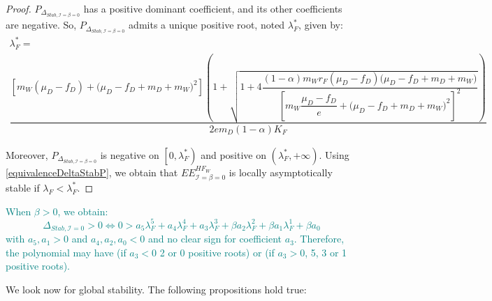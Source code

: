 \documentclass{article}
\newcommand{\lfw}{\lambda_{F}}
\newcommand{\lfw}{\lambda_{F}}
\newcommand{\cI}{\mathcal{I}}
\newcommand{\marc}[1]{\textcolor{teal}{#1}}
\begin{document}
\begin{proof}
$P_{\Delta_{Stab, \cI = \beta = 0}}$ has a positive dominant coefficient, and its other coefficients are negative. So,  $P_{\Delta_{Stab, \cI= \beta = 0}}$ admits a unique positive root, noted $\lfw^*$, given by:
\begin{multline}
\lfw^* = \\
 \dfrac{\left[m_{W}(\mu_{D}-f_{D})+\big(\mu_{D}-f_{D}+m_{D}+m_{W})^{2}\right]\left(1+\sqrt{1+4\dfrac{(1-\alpha)m_{W}r_{F}\left(\mu_{D}-f_{D}\right)\big(\mu_{D}-f_{D}+m_{D}+m_{W})}{\left[m_{W}\dfrac{\mu_{D}-f_{D}}{e}+\big(\mu_{D}-f_{D}+m_{D}+m_{W})^{2}\right]^{2}}}\right)}{2em_D (1-\alpha) K_F }
\end{multline}

Moreover, $P_{\Delta_{Stab, \cI = \beta = 0}}$ is negative on $\left[0, \lfw^* \right)$ and positive on $\left(\lfw ^*, +\infty \right)$. Using \eqref{equivalenceDeltaStabP}, we obtain that $EE^{HF_W}_{\cI = \beta = 0}$ is locally asymptotically stable if $\lfw  < \lfw ^*$.
\end{proof}

\marc{
When $\beta > 0$, we obtain:
\begin{equation*}
\Delta_{Stab, \cI = 0} > 0 \Leftrightarrow 0 > a_5 \lfw ^5 + a_4 \lfw ^4 + a_3 \lfw ^3 + \beta a_2 \lfw ^2 + \beta a_1 \lfw ^1 + \beta a_0
\end{equation*}
with $a_5, a_1 > 0$ and $a_4, a_2, a_0 < 0$ and no clear sign for coefficient $a_3$. Therefore, the polynomial may have (if $a_3<0$ 2 or 0 positive roots) or (if $a_3 > 0$, 5, 3 or 1 positive roots).}

%
%
We look now for global stability. The following propositions hold true:
\end{document}
